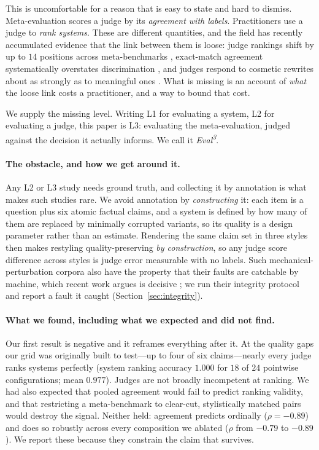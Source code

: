 \documentclass{article}
\theoremstyle{plain}
\theoremstyle{definition}
\begin{document}
This is uncomfortable for a reason that is easy to state and hard to dismiss. Meta-evaluation
scores a judge by its \emph{agreement with labels}. Practitioners use a judge to
\emph{rank systems}. These are different quantities, and the field has recently accumulated
evidence that the link between them is loose: judge rankings shift by up to $14$ positions
across meta-benchmarks \citep{norman2026reliability}, exact-match agreement systematically
overstates discrimination \citep{rao2026agreement}, and judges respond to cosmetic rewrites
about as strongly as to meaningful ones \citep{weng2026policy}. What is missing is an account
of \emph{what} the loose link costs a practitioner, and a way to bound that cost.

We supply the missing level. Writing L1 for evaluating a system, L2 for evaluating a judge,
this paper is L3: evaluating the meta-evaluation, judged against the decision it actually
informs. We call it \emph{Eval\textsuperscript{3}}.

\paragraph{The obstacle, and how we get around it.}
Any L2 or L3 study needs ground truth, and collecting it by annotation is what makes such
studies rare. We avoid annotation by \emph{constructing} it: each item is a question plus six
atomic factual claims, and a system is defined by how many of them are replaced by minimally
corrupted variants, so its quality is a design parameter rather than an estimate. Rendering the
same claim set in three styles then makes restyling quality-preserving \emph{by construction},
so any judge score difference across styles is judge error measurable with no labels. Such
mechanical-perturbation corpora also have the property that their faults are catchable by
machine, which recent work argues is decisive \citep{balli2026oracle}; we run their integrity
protocol and report a fault it caught (Section~\ref{sec:integrity}).

\paragraph{What we found, including what we expected and did not find.}
Our first result is negative and it reframes everything after it. At the quality gaps our
grid was originally built to test---up to four of six claims---nearly every judge ranks
systems perfectly (system ranking accuracy $1.000$ for $18$ of $24$ pointwise
configurations; mean $0.977$). Judges are not broadly incompetent at ranking. We had also
expected that pooled agreement would fail to predict ranking validity, and that restricting
a meta-benchmark to clear-cut, stylistically matched pairs would destroy the signal. Neither
held: agreement predicts ordinally ($\rho=-0.89$) and does so robustly across every
composition we ablated ($\rho$ from $-0.79$ to $-0.89$). We report these because they
constrain the claim that survives.
\end{document}
